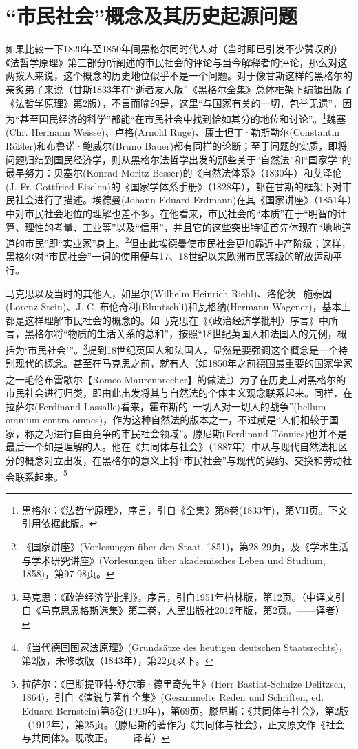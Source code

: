\chapter{“市民社会”概念及其历史起源问题}

如果比较一下1820年至1850年间黑格尔同时代人对（当时即已引发不少赞叹的）《法哲学原理》第三部分所阐述的市民社会的评论与当今解释者的评论，那么对这两拨人来说，这个概念的历史地位似乎不是一个问题。对于像甘斯这样的黑格尔的亲炙弟子来说（甘斯1833年在“逝者友人版”《黑格尔全集》总体框架下编辑出版了《法哲学原理》第2版），不言而喻的是，这里“与国家有关的一切，包举无遗”，因为“甚至国民经济的科学”都能“在市民社会中找到恰如其分的地位和讨论”。\footnote{黑格尔：《法哲学原理》，序言，引自《全集》第8卷(1833年)，第VII页。下文引用依据此版。}魏塞(Chr. Hermann Weisse)、卢格(Arnold Ruge)、康士但丁·勒斯勒尔(Constantin Rößler)和布鲁诺·鲍威尔(Bruno Bauer)都有同样的论断；至于问题的实质，即将问题归结到国民经济学，则从黑格尔法哲学出发的那些关于“自然法”和“国家学”的最早努力：贝塞尔(Konrad Moritz Besser)的《自然法体系》（1830年）和艾泽伦(J. Fr. Gottfried Eiselen)的《国家学体系手册》（1828年），都在甘斯的框架下对市民社会进行了描述。埃德曼(Johann Eduard Erdmann)在其《国家讲座》（1851年）中对市民社会地位的理解也差不多。在他看来，市民社会的“本质”在于“明智的计算、理性的考量、工业等”以及“信用”，并且它的这些突出特征首先体现在“地地道道的市民”即“实业家”身上。\footnote{《国家讲座》(Vorlesungen über den Staat, 1851)，第28-29页，及《学术生活与学术研究讲座》(Vorlesungen über akademisches Leben und Studium, 1858)，第97-98页。}但由此埃德曼使市民社会更加靠近中产阶级；这样，黑格尔对“市民社会”一词的使用便与17、18世纪以来欧洲市民等级的解放运动平行。

马克思以及当时的其他人，如里尔(Wilhelm Heinrich Riehl)、洛伦茨·施泰因(Lorenz Stein)、J. C. 布伦奇利(Bluntschli)和瓦格纳(Hermann Wagener)，基本上都是这样理解市民社会的概念的。如马克思在《〈政治经济学批判〉序言》中所言，黑格尔将“物质的生活关系的总和”，按照“18世纪英国人和法国人的先例，概括为‘市民社会’”。\footnote{马克思：《政治经济学批判》，序言，引自1951年柏林版，第12页。（中译文引自《马克思恩格斯选集》第二卷，人民出版社2012年版，第2页。——译者）}提到18世纪英国人和法国人，显然是要强调这个概念是一个特别现代的概念。甚至在马克思之前，就有人（如1850年之前德国最重要的国家学家之一毛伦布雷歇尔【Romeo Maurenbrecher】的做法\footnote{《当代德国国家法原理》(Grundsätze des heutigen deutschen Staatsrechts)，第2版，未修改版（1843年），第22页以下。}）为了在历史上对黑格尔的市民社会进行归类，即由此出发将其与自然法的个体主义观念联系起来。同样，在拉萨尔(Ferdinand Lassalle)看来，霍布斯的“一切人对一切人的战争”(bellum omnium contra omnes)，作为这种自然法的版本之一，不过就是“人们相较于国家，称之为进行自由竞争的市民社会领域”。滕尼斯(Ferdinand Tönnies)也并不是最后一个如是理解的人。他在《共同体与社会》（1887年）中从与现代自然法相区分的概念对立出发，在黑格尔的意义上将“市民社会”与现代的契约、交换和劳动社会联系起来。\footnote{拉萨尔：《巴斯提亚特-舒尔策·德里奇先生》(Herr Bastiat-Schulze Delitzsch, 1864)，引自《演说与著作全集》(Gesammelte Reden und Schriften, ed. Eduard Bernstein)第5卷(1919年)，第69页。滕尼斯：《共同体与社会》，第2版（1912年），第25页。（滕尼斯的著作为《共同体与社会》，正文原文作《社会与共同体》。现改正。——译者）}

